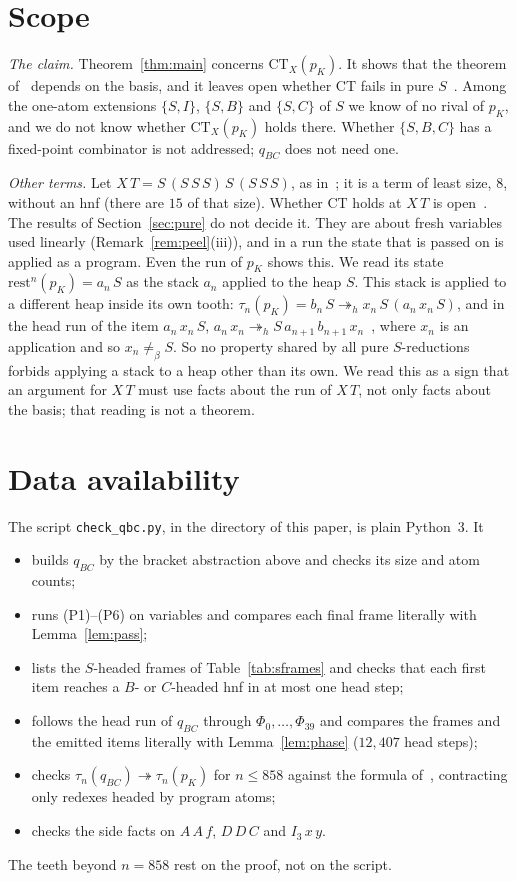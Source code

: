 \documentclass[11pt]{amsart}
\theoremstyle{definition}
\newcommand{\red}{\twoheadrightarrow}
\newcommand{\hred}{\twoheadrightarrow_h}
\newcommand{\nconv}{\neq_\beta}
\newcommand{\rest}{\mathrm{rest}}
\newcommand{\CT}{\mathrm{CT}}
\newcommand{\pK}{p_K}
\newcommand{\qBC}{q_{BC}}
\newcommand{\Ir}{I_3}
\begin{document}
\section{Scope}\label{sec:scope}

\emph{The claim.} Theorem~\ref{thm:main} concerns $\CT_X(\pK)$. It shows that the theorem
of~\citep{s11} depends on the basis, and it leaves open whether CT fails in pure $S$~\citep{s15}. Among
the one-atom extensions $\{S,I\}$, $\{S,B\}$ and $\{S,C\}$ of $S$ we know of no rival of $\pK$, and we do
not know whether $\CT_X(\pK)$ holds there. Whether $\{S,B,C\}$ has a fixed-point combinator is not
addressed; $\qBC$ does not need one.

\emph{Other terms.} Let $X\,T=S\,(S\,S\,S)\,S\,(S\,S\,S)$, as in~\citep[Remark~15]{s15}; it is a term of
least size, $8$, without an hnf (there are $15$ of that size). Whether CT holds at $X\,T$ is
open~\citep[Remark~15]{s15}. The results of Section~\ref{sec:pure} do not decide it. They are about fresh
variables used linearly (Remark~\ref{rem:peel}(iii)), and in a run the state that is passed on is
applied as a program. Even the run of $\pK$ shows this. We read its state $\rest^n(\pK)=a_n\,S$ as the
stack $a_n$ applied to the heap $S$. This stack is applied to a different heap inside its own tooth:
$\tau_n(\pK)=b_n\,S\hred x_n\,S\,(a_n\,x_n\,S)$, and in the head run of the item $a_n\,x_n\,S$,
$a_n\,x_n\hred S\,a_{n+1}\,b_{n+1}\,x_n$~\citep[equations~(2) and~(3)]{s11}, where $x_n$ is an
application and so $x_n\nconv S$. So no property shared by all pure $S$-reductions forbids applying a
stack to a heap other than its own. We read this as a sign that an argument for $X\,T$ must use facts
about the run of $X\,T$, not only facts about the basis; that reading is not a theorem.

\section*{Data availability}
\sloppy
The script \texttt{check\_qbc.py}, in the directory of this paper, is plain Python~3. It
\begin{itemize}
\item builds $\qBC$ by the bracket abstraction above and checks its size and atom counts;
\item runs (P1)--(P6) on variables and compares each final frame literally with Lemma~\ref{lem:pass};
\item lists the $S$-headed frames of Table~\ref{tab:sframes} and checks that each first item reaches a
$B$- or $C$-headed hnf in at most one head step;
\item follows the head run of $\qBC$ through $\Phi_0,\dots,\Phi_{39}$ and compares the frames and the
emitted items literally with Lemma~\ref{lem:phase} ($12{,}407$ head steps);
\item checks $\tau_n(\qBC)\red\tau_n(\pK)$ for $n\le858$ against the formula of~\citep[\S3]{s11},
contracting only redexes headed by program atoms;
\item checks the side facts on $A\,A\,f$, $D\,D\,C$ and $\Ir\,x\,y$.
\end{itemize}
The teeth beyond $n=858$ rest on the proof, not on the script.
\end{document}

